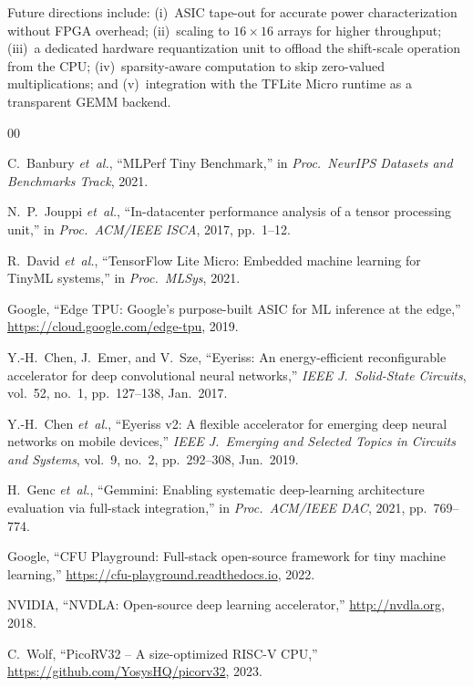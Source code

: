 \documentclass[conference]{IEEEtran}
\begin{document}
Future directions include: (i)~ASIC tape-out for accurate power characterization without FPGA overhead; (ii)~scaling to $16{\times}16$ arrays for higher throughput; (iii)~a dedicated hardware requantization unit to offload the shift-scale operation from the CPU; (iv)~sparsity-aware computation to skip zero-valued multiplications; and (v)~integration with the TFLite Micro runtime as a transparent GEMM backend.

\balance
\begin{thebibliography}{00}

C.~Banbury \emph{et~al.}, ``MLPerf Tiny Benchmark,'' in \emph{Proc.\ NeurIPS Datasets and Benchmarks Track}, 2021.

N.~P.~Jouppi \emph{et~al.}, ``In-datacenter performance analysis of a tensor processing unit,'' in \emph{Proc.\ ACM/IEEE ISCA}, 2017, pp.~1--12.

R.~David \emph{et~al.}, ``TensorFlow Lite Micro: Embedded machine learning for TinyML systems,'' in \emph{Proc.\ MLSys}, 2021.

Google, ``Edge TPU: Google's purpose-built ASIC for ML inference at the edge,'' \url{https://cloud.google.com/edge-tpu}, 2019.

Y.-H.~Chen, J.~Emer, and V.~Sze, ``Eyeriss: An energy-efficient reconfigurable accelerator for deep convolutional neural networks,'' \emph{IEEE J.\ Solid-State Circuits}, vol.~52, no.~1, pp.~127--138, Jan.\ 2017.

Y.-H.~Chen \emph{et~al.}, ``Eyeriss v2: A flexible accelerator for emerging deep neural networks on mobile devices,'' \emph{IEEE J.\ Emerging and Selected Topics in Circuits and Systems}, vol.~9, no.~2, pp.~292--308, Jun.\ 2019.

H.~Genc \emph{et~al.}, ``Gemmini: Enabling systematic deep-learning architecture evaluation via full-stack integration,'' in \emph{Proc.\ ACM/IEEE DAC}, 2021, pp.~769--774.

Google, ``CFU Playground: Full-stack open-source framework for tiny machine learning,'' \url{https://cfu-playground.readthedocs.io}, 2022.

NVIDIA, ``NVDLA: Open-source deep learning accelerator,'' \url{http://nvdla.org}, 2018.

C.~Wolf, ``PicoRV32 -- A size-optimized RISC-V CPU,'' \url{https://github.com/YosysHQ/picorv32}, 2023.

\end{thebibliography}
\end{document}
